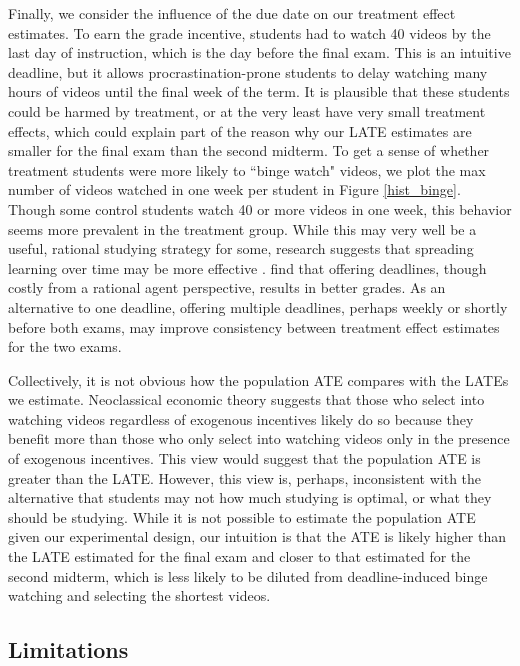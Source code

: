 \documentclass[12pt]{article}
\begin{document}
Finally, we consider the influence of the due date on our treatment effect estimates. To earn the grade incentive, students had to watch 40 videos by the last day of instruction, which is the day before the final exam. This is an intuitive deadline, but it allows procrastination-prone students to delay watching many hours of videos until the final week of the term. It is plausible that these students could be harmed by treatment, or at the very least have very small treatment effects, which could explain part of the reason why our LATE estimates are smaller for the final exam than the second midterm. To get a sense of whether treatment students were more likely to ``binge watch" videos, we plot the max number of videos watched in one week per student in Figure \ref{hist_binge}. Though some control students watch 40 or more videos in one week, this behavior seems more prevalent in the treatment group. While this may very well be a useful, rational studying strategy for some, research suggests that spreading learning over time may be more effective \parencite{kornell2009}. \textcite{aw2002} find that offering deadlines, though costly from a rational agent perspective, results in better grades. As an alternative to one deadline, offering multiple deadlines, perhaps weekly or shortly before both exams, may improve consistency between treatment effect estimates for the two exams.

Collectively, it is not obvious how the population ATE compares with the LATEs we estimate. Neoclassical economic theory suggests that those who select into watching videos regardless of exogenous incentives likely do so because they benefit more than those who only select into watching videos only in the presence of exogenous incentives. This view would suggest that the population ATE is greater than the LATE. However, this view is, perhaps, inconsistent with the alternative that students may not how much studying is optimal, or what they should be studying. While it is not possible to estimate the population ATE given our experimental design, our intuition is that the ATE is likely higher than the LATE estimated for the final exam and closer to that estimated for the second midterm, which is less likely to be diluted from deadline-induced binge watching and selecting the shortest videos.

\subsection{Limitations}
\end{document}
